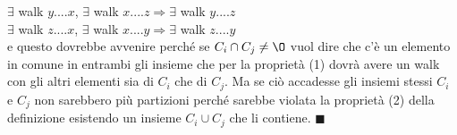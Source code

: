 \begin{demostration}
\begin{enumerate}
    $\exists$ walk $y .... x$, $\exists$ walk $x .... z \Longrightarrow \exists$ walk $y .... z$\\
    $\exists$ walk $z .... x$, $\exists$ walk $x .... y \Longrightarrow \exists$ walk $z .... y$ \\
    e questo dovrebbe avvenire perché se $C_i \cap C_j \neq \O$ vuol dire che c'è un elemento in comune in entrambi gli insieme che per la proprietà (1) dovrà avere un walk con gli altri elementi sia di $C_i$ che di $C_j$.
    Ma se ciò accadesse gli insiemi stessi $C_i$ e $C_j$ non sarebbero più partizioni perché sarebbe violata la proprietà (2) della definizione esistendo un insieme $C_i \cup C_j$ che li contiene. $\blacksquare$
\end{enumerate}
\end{demostration}

